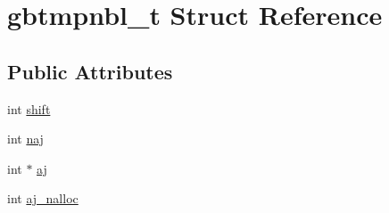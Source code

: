 \hypertarget{structgbtmpnbl__t}{\section{gbtmpnbl\-\_\-t \-Struct \-Reference}
\label{structgbtmpnbl__t}
}
\subsection*{\-Public \-Attributes}
\begin{DoxyCompactItemize}
\item 
int \hyperlink{structgbtmpnbl__t_a292dcf5e2c435f762d5261464cb2c325}{shift}
\item 
int \hyperlink{structgbtmpnbl__t_a8ffd80e6193de34eb58ef0e56d7510d0}{naj}
\item 
int $\ast$ \hyperlink{structgbtmpnbl__t_a1802dd0047b141c167ec9221e540a094}{aj}
\item 
int \hyperlink{structgbtmpnbl__t_a382798f061edba02124a61b651a70209}{aj\-\_\-nalloc}
\end{DoxyCompactItemize}


